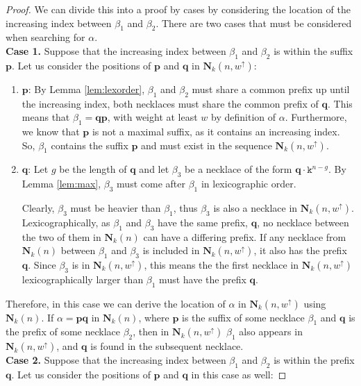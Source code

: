 \documentclass[10pt,a4paper]{amsart}
\newcommand{\bN}{\mathbf{N}}
\newcommand{\bp}{\mathbf{p}}
\newcommand{\bq}{\mathbf{q}}
\renewcommand{\tt} {\mathtt}
\begin{document}
\begin{proof} 
%
We can divide this into a proof by cases by considering the location of the increasing index between $\beta_1$ and $\beta_2$. There are two cases that must be considered when searching for $\alpha$. \\

\noindent
\textbf{Case 1.} Suppose that the increasing index between $\beta_1$ and $\beta_2$ is within the suffix $\bp$. Let us consider the positions of $\bp$ and $\bq$ in $\bN_k(n,w^\uparrow)$:

\begin{enumerate}
    \item $\bp$: By Lemma \ref{lem:lexorder}, $\beta_1$ and $\beta_2$ must share a common prefix up until the increasing index, both necklaces must share the common prefix of $\bq$. This means that $\beta_1 = \bq \bp$, with weight at least $w$ by definition of $\alpha$. Furthermore, we know that $\bp$ is not a maximal suffix, as it contains an increasing index. So, $\beta_1$ contains the suffix $\bp$ and must exist in the sequence $\bN_k(n,w^\uparrow)$.

    \item $\bq$: Let $g$ be the length of $\bq$ and let $\beta_3$ be a necklace of the form $\bq \cdot \tt{k}^{n-g}$. By Lemma \ref{lem:max}, $\beta_3$ must come after $\beta_1$ in lexicographic order.

    Clearly, $\beta_3$ must be heavier than $\beta_1$, thus $\beta_3$ is also a necklace in $\bN_k(n,w^\uparrow)$. Lexicographically, as $\beta_1$ and $\beta_3$ have the same prefix, $\bq$, no necklace between the two of them in $\bN_k(n)$ can have a differing prefix. If any necklace from $\bN_k(n)$ between $\beta_1$ and $\beta_3$ is included in $\bN_k(n,w^\uparrow)$, it also has the prefix $\bq$. Since $\beta_3$ is in $\bN_k(n,w^\uparrow)$, this means the the first necklace in $\bN_k(n,w^\uparrow)$ lexicographically larger than $\beta_1$ must have the prefix $\bq$.
\end{enumerate}

Therefore, in this case we can derive the location of $\alpha$ in $\bN_k(n,w^\uparrow)$ using $\bN_k(n)$. If $\alpha = \bp \bq$ in $\bN_k(n)$, where $\bp$ is the suffix of some necklace $\beta_1$ and $\bq$ is the prefix of some necklace $\beta_2$, then in $\bN_k(n,w^\uparrow)$ $\beta_1$ also appears in $\bN_k(n,w^\uparrow)$, and $\bq$ is found in the subsequent necklace. \\

\noindent
\textbf{Case 2.} Suppose that the increasing index between $\beta_1$ and $\beta_2$ is within the prefix $\bq$. Let us consider the positions of $\bp$ and $\bq$ in this case as well:


\end{proof}
\end{document}
